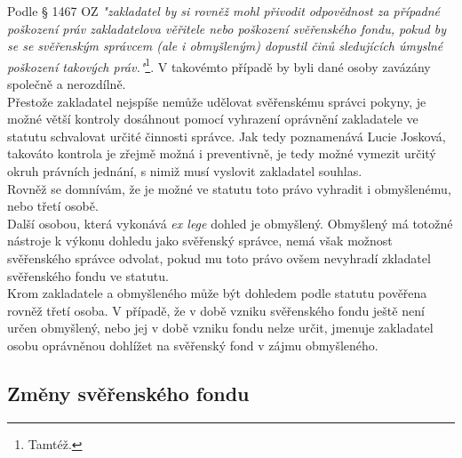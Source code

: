 \documentclass{article}
\begin{document}
Podle § 1467 OZ \textit{"zakladatel by si rovněž mohl přivodit odpovědnost za případné poškození práv zakladatelova věřitele nebo poškození svěřenského fondu, pokud by se se svěřenským správcem (ale i obmyšleným) dopustil činů sledujících úmyslné poškození takových práv."}\footnote{Tamtéž.}. V takovémto případě by byli dané osoby zavázány společně a nerozdílně.\\

Přestože zakladatel nejspíše nemůže udělovat svěřenskému správci pokyny, je možné větší kontroly dosáhnout pomocí vyhrazení oprávnění zakladatele ve statutu schvalovat určité činnosti správce. Jak tedy poznamenává Lucie Josková, takováto kontrola je zřejmě možná i preventivně, je tedy možné vymezit určitý okruh právních jednání, s nimiž musí vyslovit zakladatel souhlas. \\

Rovněž se domnívám, že je možné ve statutu toto právo vyhradit i obmyšlenému, nebo třetí osobě.\\


Další osobou, která vykonává \textit{ex lege} dohled je obmyšlený. Obmyšlený má totožné nástroje k výkonu dohledu jako svěřenský správce, nemá však možnost svěřenského správce odvolat, pokud mu toto právo ovšem nevyhradí zkladatel svěřenského fondu ve statutu.\\

Krom zakladatele a obmyšleného může být dohledem podle statutu pověřena rovněž třetí osoba. V případě, že v době vzniku svěřenského fondu ještě není určen obmyšlený, nebo jej v době vzniku fondu nelze určit, jmenuje zakladatel osobu oprávněnou dohlížet na svěřenský fond v zájmu obmyšleného.

\subsection{Změny svěřenského fondu}
\end{document}
